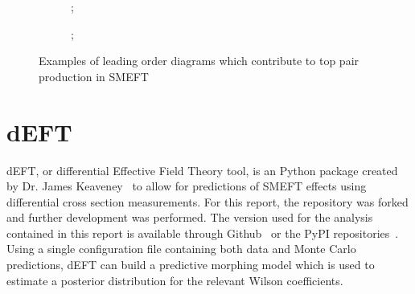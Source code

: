 \documentclass[a4paper,11pt]{article}
\begin{document}
\begin{figure}[htb]
    \centering
    \begin{subfigure}[b]{0.3\textwidth}
        \centering
        ;
    \end{subfigure}
    \hfill
    \begin{subfigure}[b]{0.3\textwidth}
        \centering
        ;
    \end{subfigure}
    \hfill
    \begin{subfigure}[b]{0.3\textwidth}
        \centering
    \end{subfigure}

    \caption{Examples of leading order diagrams which contribute to top pair production in SMEFT}
    \label{fig:smeft_diagrams}
\end{figure}




\section{dEFT}

dEFT, or differential Effective Field Theory tool, is an Python package created by Dr. James Keaveney~\cite{Keaveney_dEFT} to allow for predictions of SMEFT effects using differential cross section measurements.
For this report, the repository was forked and further development was performed.
The version used for the analysis contained in this report is available through Github~\cite{codecalec_dEFT} or the PyPI repositories~\cite{pypi_dEFT}.
Using a single configuration file containing both data and Monte Carlo predictions, dEFT can build a predictive morphing model which is used to estimate a posterior distribution for the relevant Wilson coefficients.
\end{document}
